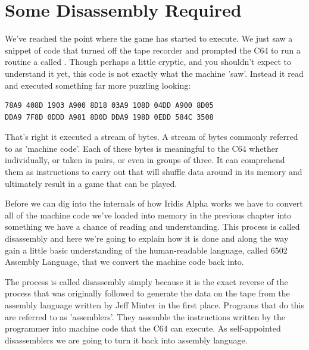 \chapter{Some Disassembly Required} 
\label{sec:disassembly}
\lstset{style=6502Style}

We've reached the point where the game has started to execute. We just saw a snippet of code that turned off the
tape recorder and prompted the C64 to run a routine a called . Though perhaps a little
cryptic, and you shouldn't expect to understand it yet, this code is not exactly what the machine 'saw'. Instead it read and executed something far more puzzling looking:


\begin{lstlisting}[caption=The first piece of machine code that is executed in Iridis Alpha.,escapechar=\%]
78A9 408D 1903 A900 8D18 03A9 108D 04DD A900 8D05
DDA9 7F8D 0DDD A981 8D0D DDA9 198D 0EDD 584C 3508 
\end{lstlisting}

That's right it executed a stream of bytes. A stream of bytes commonly referred to as 'machine code'. Each of these
bytes is meaningful to the C64 whether individually, or taken in pairs, or even in groups of three. It can comprehend them
as instructions to carry out that will shuffle data around in its memory and ultimately result in a game that
can be played.

Before we can dig into the internals of how Iridis Alpha works we have to convert all of the machine code we've
loaded into memory in the previous chapter into something we have a chance of reading and understanding. This
process is called disassembly and here we're going to explain how it is done and along the way gain a little
basic understanding of the human-readable language, called 6502 Assembly Language, that we convert the machine
code back into.

The process is called disassembly simply because it is the exact reverse of the process that was originally followed
to generate the data on the tape from the assembly language written by Jeff Minter in the first place. Programs that
do this are referred to as 'assemblers'. They assemble the instructions written by the programmer into machine code
that the C64 can execute. As self-appointed disassemblers we are going to turn it back into assembly language.

